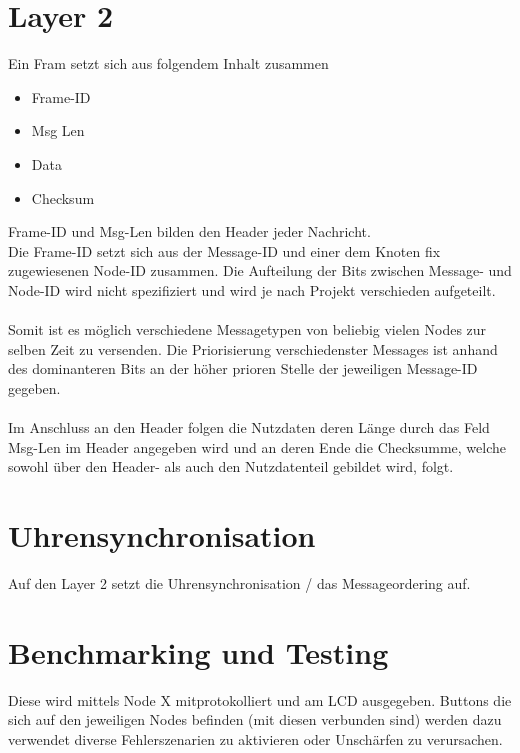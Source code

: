 \section{Layer 2}

Ein Fram setzt sich aus folgendem Inhalt zusammen
\begin{itemize}
  \item Frame-ID
  \item Msg Len
  \item Data
  \item Checksum
\end{itemize}

Frame-ID und Msg-Len bilden den Header jeder Nachricht.
\\
Die Frame-ID setzt sich aus der Message-ID und einer dem Knoten fix zugewiesenen Node-ID zusammen.
Die Aufteilung der Bits zwischen Message- und Node-ID wird nicht spezifiziert und wird je nach Projekt verschieden aufgeteilt.\\
\\
Somit ist es möglich verschiedene Messagetypen von beliebig vielen Nodes zur selben Zeit zu versenden.
Die Priorisierung verschiedenster Messages ist anhand des dominanteren Bits an der höher prioren Stelle der jeweiligen Message-ID gegeben.\\
\\
Im Anschluss an den Header folgen die Nutzdaten deren Länge durch das Feld Msg-Len im Header angegeben wird und an deren Ende die Checksumme, welche sowohl über den Header- als auch den Nutzdatenteil gebildet wird, folgt.\\

\section{Uhrensynchronisation}
Auf den Layer 2 setzt die Uhrensynchronisation / das Messageordering auf.

\section{Benchmarking und Testing}
Diese wird mittels Node X mitprotokolliert und am LCD ausgegeben.
Buttons die sich auf den jeweiligen Nodes befinden (mit diesen verbunden sind) werden dazu verwendet diverse Fehlerszenarien zu aktivieren oder Unschärfen zu verursachen.\\ 